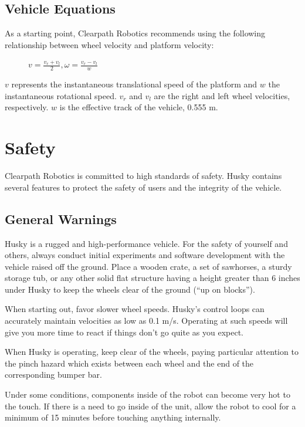 \documentclass[]{clearpath-latex/clearpath-manual}
\begin{document}
\newpage
\subsection{Vehicle Equations}

As a starting point, Clearpath Robotics recommends using the following relationship between wheel velocity and platform velocity:
\begin{figure}[h]
\centering
$v=\frac{v_r+v_l}{2} , \omega=\frac{v_r-v_l}{w}$
\end{figure}

$v$ represents the instantaneous translational speed of the platform and $w$ the instantaneous rotational speed. $v_r$ and $v_l$ are
the right and left wheel velocities, respectively. $w$ is the effective track of the vehicle, 0.555 m.

\section{Safety}
Clearpath Robotics is committed to high standards of safety. Husky contains several features to protect the safety of users and the integrity of the vehicle.

\subsection{General Warnings}

Husky is a rugged and high-performance vehicle. For the safety of yourself and others,
always conduct initial experiments and software development with the vehicle raised off the ground.
Place a wooden crate, a set of sawhorses, a sturdy storage tub, or any other solid flat structure having a
height greater than 6 inches under Husky to keep the wheels clear of the ground (“up on blocks”).

When starting out, favor slower wheel speeds. Husky’s control loops can accurately maintain velocities
as low as 0.1 m/s. Operating at such speeds will give you more time to react if things don’t go quite as you expect.

When Husky is operating, keep clear of the wheels, paying particular attention to the pinch hazard which exists between each wheel and the end of the corresponding bumper bar.

Under some conditions, components inside of the robot can become very hot to the touch. If there is a need to go inside of the unit, allow the robot to cool for a minimum of 15 minutes before touching anything internally.
\end{document}
